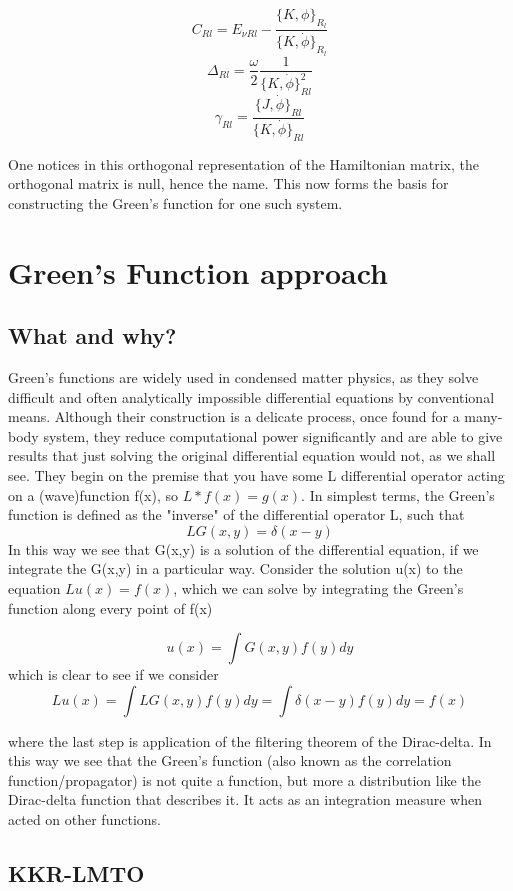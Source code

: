 \documentclass[12pt]{article}
\begin{document}
$$C_{Rl}=E_{\nu Rl}-\frac{\{K,\phi\}_R_l}{\{K,\dot{\phi}\}_R_l}$$
$$\Delta_{Rl}=\frac{\omega}{2} \frac{1}{\{K,\dot{\phi}\}^2_{Rl}}$$
$$\gamma_{Rl}=\frac{\{J,\dot{\phi}\}_{Rl}}{\{K,\dot{\phi}\}_{Rl}}$$

One notices in this orthogonal representation of the Hamiltonian matrix, the orthogonal matrix is null, hence the name. This now forms the basis for constructing the Green's function for one such system. 

\section{Green's Function approach}
\subsection{What and why?}

Green's functions are widely used in condensed matter physics, as they solve difficult and often analytically impossible differential equations by conventional means. Although their construction is a delicate process, once found for a many-body system, they reduce computational power significantly and are able to give results that just solving the original differential equation would not, as we shall see. They begin on the premise that you have some L differential operator acting on a (wave)function f(x), so $L*f(x)=g(x)$. In simplest terms, the Green's function is defined as the "inverse" of the differential operator L, such that 
$$LG(x,y)=\delta (x-y)$$
In this way we see that G(x,y) is a solution of the differential equation, if we integrate the G(x,y) in a particular way. Consider the solution u(x) to the equation $Lu(x)=f(x)$, which we can solve by integrating the Green's function along every point of f(x)

$$u(x)=\int G(x,y)f(y)dy$$
which is clear to see if we consider 
$$Lu(x)=\int LG(x,y)f(y)dy=\int \delta(x-y)f(y)dy =f(x)$$

where the last step is application of the filtering theorem of the Dirac-delta. In this way we see that the Green's function (also known as the correlation function/propagator) is not quite a function, but more a distribution like the Dirac-delta function that describes it. It acts as an integration measure when acted on other functions.

\subsection{KKR-LMTO}
\end{document}
